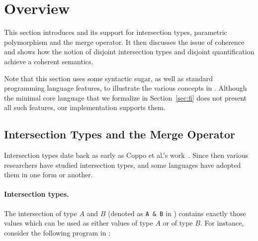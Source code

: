 \section{Overview} \label{sec:overview}

This section introduces \namedis and its support for intersection types,
parametric polymorphism and the merge operator. It then discusses
the issue of coherence and shows how the notion of disjoint
intersection types and disjoint quantification achieve a coherent semantics.

Note that this section uses some syntactic sugar, as well as standard
programming language features, to illustrate the various concepts in
\namedis. Although the minimal core language that we formalize in
Section~\ref{sec:fi} does not present all such features, our implementation
supports them.


\begin{comment}
It then shows that,
with unrestricted intersection types, the system
lacks \emph{coherence}. This motivates the introduction of
disjoint intersection types and extending universal quatification to
disjoint quantification, which is enough to ensure coherence.
\end{comment}

\subsection{Intersection Types and the Merge Operator}

Intersection types date back as early as Coppo et
al.'s work~\cite{coppo1981functional}. Since then various researchers have
studied intersection types, and some languages have adopted them in one
form or another.

\paragraph{Intersection types.}
The intersection of type $A$ and $B$ (denoted as \lstinline{A & B} in
\namedis) contains exactly those values
which can be used as either values of type $A$ or of type $B$. For instance,
consider the following program in \namedis:

